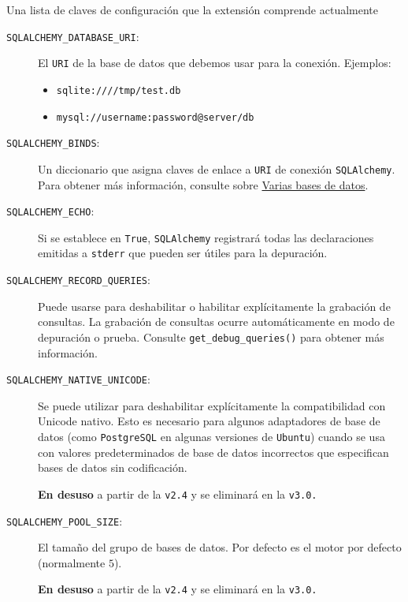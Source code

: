 \documentclass[10pt,letterpaper,notumble]{leaflet}
\begin{document}
{\begin{minipage}{2.2\linewidth}
            Una lista de claves de configuración que la extensión comprende actualmente
            
            \begin{description}
            	
            	\item[\texttt{SQLALCHEMY\_DATABASE\_URI}:]
            	El \texttt{URI} de la base de datos que debemos usar para la conexión. Ejemplos:
            	\begin{itemize}
            		\item \texttt{sqlite:////tmp/test.db}
            		
            		\item \texttt{mysql://username:password@server/db}
            	\end{itemize} 
            
            	\item[\texttt{SQLALCHEMY\_BINDS}:]
            	Un diccionario que asigna claves de enlace a \texttt{URI} de conexión \texttt{SQLAlchemy}. Para obtener más información, consulte sobre \href{https://flask-sqlalchemy.palletsprojects.com/en/2.x/binds/#binds}{Varias bases de datos}.
            	 
            	\item[\texttt{SQLALCHEMY\_ECHO}:] 
            	Si se establece en \texttt{True}, \texttt{SQLAlchemy} registrará todas las declaraciones emitidas a \texttt{stderr} que pueden ser útiles para la depuración.
            	
            	\item[\texttt{SQLALCHEMY\_RECORD\_QUERIES}:] 
            	Puede usarse para deshabilitar o habilitar explícitamente la grabación de consultas. La grabación de consultas ocurre automáticamente en modo de depuración o prueba. Consulte \texttt{get\_debug\_queries()} para obtener más información.
            	
            	\item[\texttt{SQLALCHEMY\_NATIVE\_UNICODE}:]
            	Se puede utilizar para deshabilitar explícitamente la compatibilidad con Unicode nativo. Esto es necesario para algunos adaptadores de base de datos (como \texttt{PostgreSQL} en algunas versiones de \texttt{Ubuntu}) cuando se usa con valores predeterminados de base de datos incorrectos que especifican bases de datos sin codificación.
            	
            	\textbf{En desuso} a partir de la \texttt{v2.4} y se eliminará en la \texttt{v3.0.}
            	
            	\item[\texttt{SQLALCHEMY\_POOL\_SIZE}:]
            	El tamaño del grupo de bases de datos. Por defecto es el motor por defecto (normalmente $5$).
            	
            	\textbf{En desuso} a partir de la \texttt{v2.4} y se eliminará en la \texttt{v3.0.}
            	
            \end{description}
        
        \end{minipage}
    
    }
\end{document}
